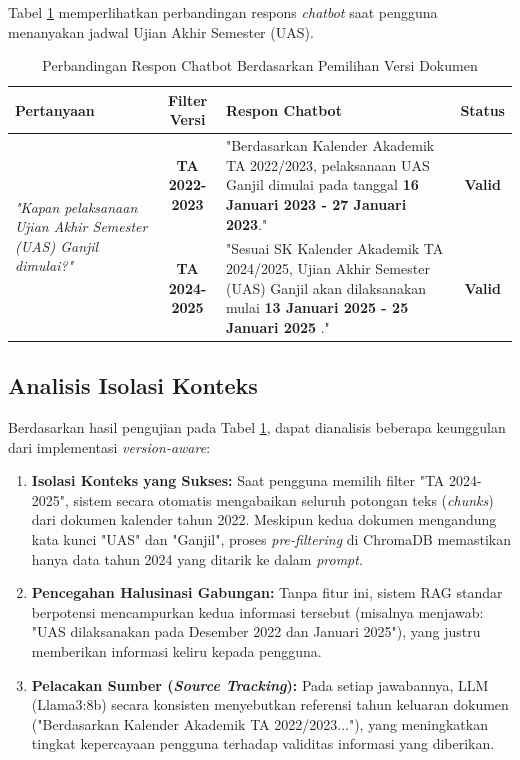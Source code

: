 Tabel \ref{tab:studi_kasus_kalender} memperlihatkan perbandingan respons \textit{chatbot} saat pengguna menanyakan jadwal Ujian Akhir Semester (UAS).

\begin{table}[h!]
    \centering
    \caption{Perbandingan Respon Chatbot Berdasarkan Pemilihan Versi Dokumen}
    \label{tab:studi_kasus_kalender}
    \renewcommand{\arraystretch}{1.5}
    \begin{tabular}{|p{3.5cm}|c|p{6cm}|c|}
        \hline
        \textbf{Pertanyaan} & \textbf{Filter Versi} & \textbf{Respon Chatbot} & \textbf{Status} \\ \hline
        \multirow{2}{3.5cm}{\textit{"Kapan pelaksanaan Ujian Akhir Semester (UAS) Ganjil dimulai?"}} 
        & \textbf{TA 2022-2023} 
        & "Berdasarkan Kalender Akademik TA 2022/2023, pelaksanaan UAS Ganjil dimulai pada tanggal \textbf{16 Januari 2023 - 27 Januari 2023}." 
        & \textbf{Valid} \\ \cline{2-4}
        
         & \textbf{TA 2024-2025} 
         & "Sesuai SK Kalender Akademik TA 2024/2025, Ujian Akhir Semester (UAS) Ganjil akan dilaksanakan mulai \textbf{13 Januari 2025 - 25 Januari 2025 }." 
         & \textbf{Valid} \\ \hline
    \end{tabular}
\end{table}

\subsection{Analisis Isolasi Konteks}

Berdasarkan hasil pengujian pada Tabel \ref{tab:studi_kasus_kalender}, dapat dianalisis beberapa keunggulan dari implementasi \textit{version-aware}:

\begin{enumerate}
    \item \textbf{Isolasi Konteks yang Sukses:} Saat pengguna memilih filter "TA 2024-2025", sistem secara otomatis mengabaikan seluruh potongan teks (\textit{chunks}) dari dokumen kalender tahun 2022. Meskipun kedua dokumen mengandung kata kunci "UAS" dan "Ganjil", proses \textit{pre-filtering} di ChromaDB memastikan hanya data tahun 2024 yang ditarik ke dalam \textit{prompt}.
    \item \textbf{Pencegahan Halusinasi Gabungan:} Tanpa fitur ini, sistem RAG standar berpotensi mencampurkan kedua informasi tersebut (misalnya menjawab: "UAS dilaksanakan pada Desember 2022 dan Januari 2025"), yang justru memberikan informasi keliru kepada pengguna.
    \item \textbf{Pelacakan Sumber (\textit{Source Tracking}):} Pada setiap jawabannya, LLM (Llama3:8b) secara konsisten menyebutkan referensi tahun keluaran dokumen ("Berdasarkan Kalender Akademik TA 2022/2023..."), yang meningkatkan tingkat kepercayaan pengguna terhadap validitas informasi yang diberikan.
\end{enumerate}

